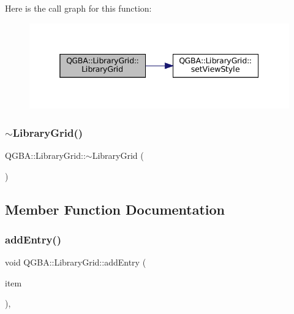 Here is the call graph for this function\+:
\nopagebreak
\begin{figure}[H]
\begin{center}
\leavevmode
\includegraphics[width=338pt]{class_q_g_b_a_1_1_library_grid_a3cd12ceee2b445b72e0a4ad6e814928e_cgraph}
\end{center}
\end{figure}
\mbox{\label{class_q_g_b_a_1_1_library_grid_ad997408b1f298cf45af0c5cf06f248ff}} 
\subsubsection{\texorpdfstring{$\sim$\+Library\+Grid()}{~LibraryGrid()}}
{\footnotesize\ttfamily Q\+G\+B\+A\+::\+Library\+Grid\+::$\sim$\+Library\+Grid (\begin{DoxyParamCaption}{ }\end{DoxyParamCaption})}



\subsection{Member Function Documentation}
\mbox{\label{class_q_g_b_a_1_1_library_grid_a7499ff69eaf0427c1fd5b09eb7812909}} 
\subsubsection{\texorpdfstring{add\+Entry()}{addEntry()}}
{\footnotesize\ttfamily void Q\+G\+B\+A\+::\+Library\+Grid\+::add\+Entry (\begin{DoxyParamCaption}\item[{\mbox{\hyperlink{namespace_q_g_b_a_a201fa9f2cb8f778666a134ba81909358}{Library\+Entry\+Ref}}}]{item }\end{DoxyParamCaption})\hspace{0.3cm}{\ttfamily [override]}, {\ttfamily [virtual]}}



